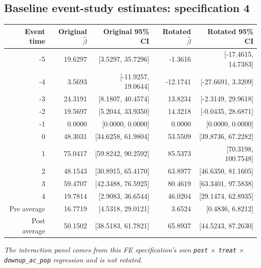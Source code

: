 \documentclass[10pt]{article}
\begin{document}
\subsection*{Baseline event-study estimates: specification 4}
\begin{center}
\scriptsize
\begin{tabular}{r rr rr}
\toprule
Event time & Original $\hat\beta$ & Original 95\% CI & Rotated $\hat\beta$ & Rotated 95\% CI \\
\midrule
-5 & 19.6297 & [3.5297, 35.7296] & -1.3616 & [-17.4615, 14.7383] \\
-4 & 3.5693 & [-11.9257, 19.0644] & -12.1741 & [-27.6691, 3.3209] \\
-3 & 24.3191 & [8.1807, 40.4574] & 13.8234 & [-2.3149, 29.9618] \\
-2 & 19.5697 & [5.2044, 33.9350] & 14.3218 & [-0.0435, 28.6871] \\
-1 & 0.0000 & [0.0000, 0.0000] & 0.0000 & [0.0000, 0.0000] \\
0 & 48.3031 & [34.6258, 61.9804] & 53.5509 & [39.8736, 67.2282] \\
1 & 75.0417 & [59.8242, 90.2592] & 85.5373 & [70.3198, 100.7548] \\
2 & 48.1543 & [30.8915, 65.4170] & 63.8977 & [46.6350, 81.1605] \\
3 & 59.4707 & [42.3488, 76.5925] & 80.4619 & [63.3401, 97.5838] \\
4 & 19.7814 & [2.9083, 36.6544] & 46.0204 & [29.1474, 62.8935] \\
\midrule
Pre average & 16.7719 & [4.5318, 29.0121] & 3.6524 & [0.4836, 6.8212] \\
Post average & 50.1502 & [38.5183, 61.7821] & 65.8937 & [44.5243, 87.2630] \\
\bottomrule
\end{tabular}
\end{center}
\medskip
\textit{The interaction panel comes from this FE specification's own \texttt{post} $\times$ \texttt{treat} $\times$ \texttt{downup\_ac\_pop} regression and is not rotated.}
\clearpage
\end{document}
